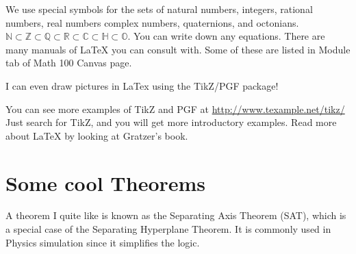 \documentclass[11pt]{amsart}
\newcommand{\NN}{{\mathbb N}}
\newcommand{\ZZ}{{\mathbb Z}}
\newcommand{\QQ}{{\mathbb Q}}
\newcommand{\RR}{{\mathbb R}}
\newcommand{\CC}{{\mathbb C}}
\theoremstyle{remark}
\theoremstyle{definition}
\begin{document}
We use special symbols for the sets of natural numbers, integers, rational numbers, real numbers complex numbers, quaternions, and octonians.  $\NN \subset \ZZ \subset \QQ \subset \RR \subset \CC\subset \mathbb H\subset \mathbb O$. You can write down any equations. There are many manuals of LaTeX you can consult with. Some of these are listed in Module tab of Math 100 Canvas page. 

I can even draw pictures in LaTex using the TikZ/PGF package!

\begin{center}
\end{center}

You can see more examples of TikZ and PGF at \url{http://www.texample.net/tikz/} Just search for TikZ, and you will get more introductory examples. 
Read more about LaTeX by looking at Gratzer's book\cite{Gratzer}.


\pagebreak
\section{Some cool Theorems}

A theorem I quite like is known as the Separating Axis Theorem (SAT),
which is a special case of the Separating Hyperplane Theorem. It is
commonly used in Physics simulation since it simplifies the
logic.
\end{document}
